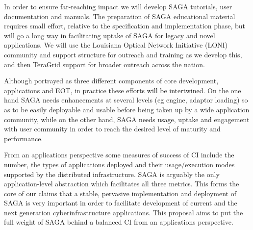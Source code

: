 \documentclass[10pt,letterpaper]{article}
\begin{document}
 In order to ensure far-reaching
impact we will develop SAGA tutorials, user documentation and
manuals.  The preparation of SAGA educational material requires
small effort, relative to the specification and implementation phase, 
but will go a long way in facilitating uptake of SAGA for legacy and
novel applications.  We will use the Louisiana Optical Network
Initiative (LONI) community and support structure for outreach and
training as we develop this, and then TeraGrid support for broader
outreach across the nation. 

Although portrayed as three different components of core development,
applications and EOT, in practice these efforts will be intertwined.
On the one hand SAGA needs enhancements at several levels (eg engine,
adaptor loading) so as to be easily deployable and usable before being
taken up by a wide application community, while on the other hand,
SAGA needs usage, uptake and engagement with user community in order
to reach the desired level of maturity and performance.



 From an applications perspective some measures of success
of CI include the number, the types of applications deployed and their
usage/execution modes supported by the distributed infrastructure.
SAGA is arguably the only application-level abstraction which
facilitates all three metrics.  This forms the core of our claims that
a stable, pervasive implementation and deployment of SAGA is
 very important in order to facilitate development of
current and the next generation cyberinfrastructure applications. This
proposal aims to put the full weight of SAGA behind a balanced CI from
an applications perspective.
\end{document}
